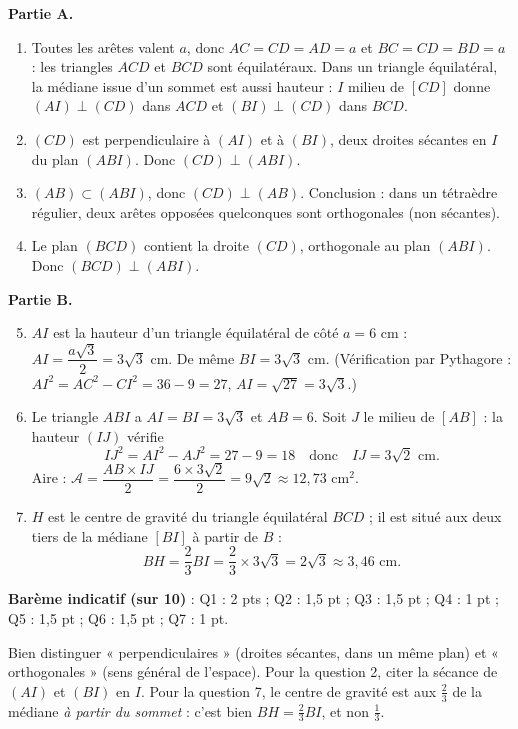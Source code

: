 \documentclass[11pt]{article}
\begin{document}
\begin{corrige}
\textbf{Partie A.}
\begin{enumerate}
\item Toutes les arêtes valent $a$, donc $AC = CD = AD = a$ et $BC = CD = BD = a$ : les triangles $ACD$ et $BCD$ sont équilatéraux. Dans un triangle équilatéral, la médiane issue d'un sommet est aussi hauteur : $I$ milieu de $[CD]$ donne $(AI) \perp (CD)$ dans $ACD$ et $(BI) \perp (CD)$ dans $BCD$.
\item $(CD)$ est perpendiculaire à $(AI)$ et à $(BI)$, deux droites sécantes en $I$ du plan $(ABI)$. Donc $(CD) \perp (ABI)$.
\item $(AB) \subset (ABI)$, donc $(CD) \perp (AB)$. Conclusion : dans un tétraèdre régulier, deux arêtes opposées quelconques sont orthogonales (non sécantes).
\item Le plan $(BCD)$ contient la droite $(CD)$, orthogonale au plan $(ABI)$. Donc $(BCD) \perp (ABI)$.
\end{enumerate}
\textbf{Partie B.}
\begin{enumerate}
\setcounter{enumi}{4}
\item $AI$ est la hauteur d'un triangle équilatéral de côté $a = 6$ cm : $AI = \dfrac{a\sqrt{3}}{2} = 3\sqrt{3}$ cm. De même $BI = 3\sqrt{3}$ cm. (Vérification par Pythagore : $AI^2 = AC^2 - CI^2 = 36 - 9 = 27$, $AI = \sqrt{27} = 3\sqrt{3}$.)
\item Le triangle $ABI$ a $AI = BI = 3\sqrt{3}$ et $AB = 6$. Soit $J$ le milieu de $[AB]$ : la hauteur $(IJ)$ vérifie
\[ IJ^2 = AI^2 - AJ^2 = 27 - 9 = 18 \quad \text{donc} \quad IJ = 3\sqrt{2} \text{ cm}. \]
Aire : $\mathcal{A} = \dfrac{AB \times IJ}{2} = \dfrac{6 \times 3\sqrt{2}}{2} = 9\sqrt{2} \approx 12{,}73 \text{ cm}^2$.
\item $H$ est le centre de gravité du triangle équilatéral $BCD$ ; il est situé aux deux tiers de la médiane $[BI]$ à partir de $B$ :
\[ BH = \frac{2}{3} BI = \frac{2}{3} \times 3\sqrt{3} = 2\sqrt{3} \approx 3{,}46 \text{ cm}. \]
\end{enumerate}
\textbf{Barème indicatif (sur 10)} : Q1 : 2 pts ; Q2 : 1,5 pt ; Q3 : 1,5 pt ; Q4 : 1 pt ; Q5 : 1,5 pt ; Q6 : 1,5 pt ; Q7 : 1 pt.
\begin{attention}
Bien distinguer « perpendiculaires » (droites sécantes, dans un même plan) et « orthogonales » (sens général de l'espace). Pour la question 2, citer la sécance de $(AI)$ et $(BI)$ en $I$. Pour la question 7, le centre de gravité est aux $\frac{2}{3}$ de la médiane \emph{à partir du sommet} : c'est bien $BH = \frac{2}{3}BI$, et non $\frac{1}{3}$.
\end{attention}
\end{corrige}
\end{document}
